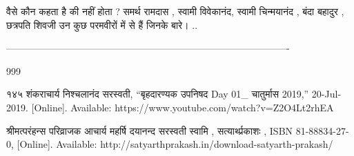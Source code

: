 \documentclass[oneside,12pt]{book} %
\begin{document}
वैसे कौन कहता है की नहीं होता ?
समर्थ रामदास , स्वामी विवेकानंद, स्वामी चिन्मयानंद , बंदा बहादुर , छत्रपति शिवजी उन कुछ परमवीरों में से हैं जिनके बारे। ..



----------------------------------------------------------------------------------------
\begin{thebibliography}{999}

  १४५ शंकराचार्य निश्चलानंद सरस्वती, “बृहदारण्यक उपनिषद Day 01_ चातुर्मास 2019,” 20-Jul-2019.  [Online]. Available: https://www.youtube.com/watch?v=Z2O4Lt2rhEA

  श्रीमत्परंहन्स परिव्राजक आचार्य महर्षि दयानन्द सरस्वती स्वामि , सत्यार्थ्प्रकाशः , ISBN 81-88834-27-0, [Online]. Available: http://satyarthprakash.in/download-satyarth-prakash/

\end{thebibliography}
\end{document}
